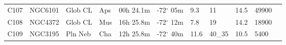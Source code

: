 \begin{longtable}{@{}lllllllllll@{}}
C107       & NGC6101     & Glob CL    & Aps       & 00h 24.1m & -72$^{\circ}$ 05m  & 9.3       & 11                   & 14.5     & 49900               &                                 \\
C108       & NGC4372     & Glob CL    & Mus       & 16h 25.8m & -72$^{\circ}$ 12m  & 7.8       & 19                   & 14.2     & 18900               &                                 \\
C109       & NGC3195     & Pln Neb    & Cha       & 12h 25.8m & -72$^{\circ}$ 40m  & 11.6      & 40\_35               & 10.5     & 5400                &                                 \\
\hline
\end{longtable}







